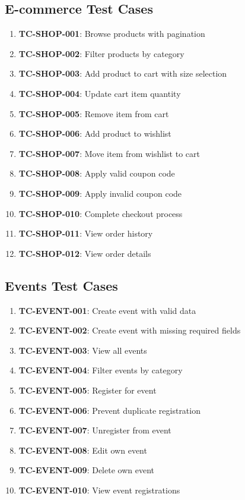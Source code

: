 \documentclass{scrreprt}
\begin{document}
\subsection{E-commerce Test Cases}
\begin{enumerate}
\item \textbf{TC-SHOP-001}: Browse products with pagination
\item \textbf{TC-SHOP-002}: Filter products by category
\item \textbf{TC-SHOP-003}: Add product to cart with size selection
\item \textbf{TC-SHOP-004}: Update cart item quantity
\item \textbf{TC-SHOP-005}: Remove item from cart
\item \textbf{TC-SHOP-006}: Add product to wishlist
\item \textbf{TC-SHOP-007}: Move item from wishlist to cart
\item \textbf{TC-SHOP-008}: Apply valid coupon code
\item \textbf{TC-SHOP-009}: Apply invalid coupon code
\item \textbf{TC-SHOP-010}: Complete checkout process
\item \textbf{TC-SHOP-011}: View order history
\item \textbf{TC-SHOP-012}: View order details
\end{enumerate}

\subsection{Events Test Cases}
\begin{enumerate}
\item \textbf{TC-EVENT-001}: Create event with valid data
\item \textbf{TC-EVENT-002}: Create event with missing required fields
\item \textbf{TC-EVENT-003}: View all events
\item \textbf{TC-EVENT-004}: Filter events by category
\item \textbf{TC-EVENT-005}: Register for event
\item \textbf{TC-EVENT-006}: Prevent duplicate registration
\item \textbf{TC-EVENT-007}: Unregister from event
\item \textbf{TC-EVENT-008}: Edit own event
\item \textbf{TC-EVENT-009}: Delete own event
\item \textbf{TC-EVENT-010}: View event registrations
\end{enumerate}
\end{document}
